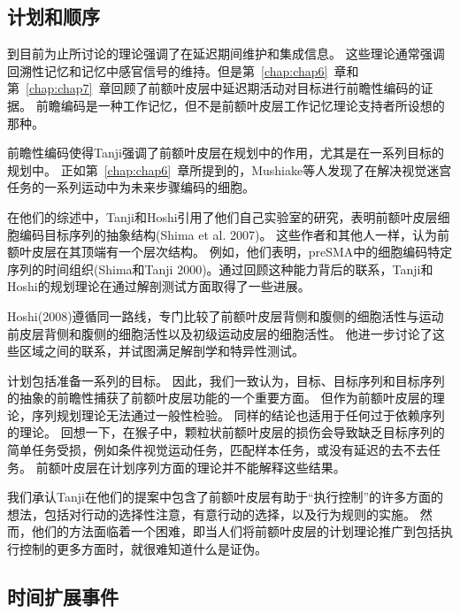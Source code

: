 \subsection{计划和顺序}

到目前为止所讨论的理论强调了在延迟期间维护和集成信息。
这些理论通常强调回溯性记忆和记忆中感官信号的维持。但是第~\ref{chap:chap6}~章和第~\ref{chap:chap7}~章回顾了前额叶皮层中延迟期活动对目标进行前瞻性编码的证据。
前瞻编码是一种工作记忆，但不是前额叶皮层工作记忆理论支持者所设想的那种。
\par


前瞻性编码使得Tanji\cite{tanji2008role}强调了前额叶皮层在规划中的作用，尤其是在一系列目标的规划中。
正如第~\ref{chap:chap6}~章所提到的，Mushiake等人\cite{mushiake2006activity}发现了在解决视觉迷宫任务的一系列运动中为未来步骤编码的细胞。
\par


在他们的综述中，Tanji和Hoshi引用了他们自己实验室的研究，表明前额叶皮层细胞编码目标序列的抽象结构(Shima et al. 2007)。
这些作者和其他人一样，认为前额叶皮层在其顶端有一个层次结构。
例如，他们表明，preSMA中的细胞编码特定序列的时间组织(Shima和Tanji 2000)。通过回顾这种能力背后的联系，Tanji和Hoshi的规划理论在通过解剖测试方面取得了一些进展。
\par


Hoshi(2008)遵循同一路线，专门比较了前额叶皮层背侧和腹侧的细胞活性与运动前皮层背侧和腹侧的细胞活性以及初级运动皮层的细胞活性。
他进一步讨论了这些区域之间的联系，并试图满足解剖学和特异性测试。
\par


计划包括准备一系列的目标。
因此，我们一致认为，目标、目标序列和目标序列的抽象的前瞻性捕获了前额叶皮层功能的一个重要方面。
但作为前额叶皮层的理论，序列规划理论无法通过一般性检验。
同样的结论也适用于任何过于依赖序列的理论。
回想一下，在猴子中，颗粒状前额叶皮层的损伤会导致缺乏目标序列的简单任务受损，例如条件视觉运动任务\cite{bussey2001role}，匹配样本任务\cite{rushworth1997ventral}，或没有延迟的去不去任务\cite{iversen1970perseverative}。
前额叶皮层在计划序列方面的理论并不能解释这些结果。
\par


我们承认Tanji\cite{tanji2008role}在他们的提案中包含了前额叶皮层有助于“执行控制”的许多方面的想法，包括对行动的选择性注意，有意行动的选择，以及行为规则的实施。
然而，他们的方法面临着一个困难，即当人们将前额叶皮层的计划理论推广到包括执行控制的更多方面时，就很难知道什么是证伪。



\subsection{时间扩展事件}

